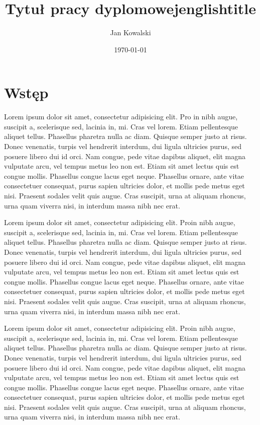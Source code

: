 \documentclass{mini}
\title{Tytuł pracy dyplomowej}
\title{englishtitle}
\author{Jan Kowalski}
\date{\today}
\begin{document}
\maketitle
\tableofcontents

\chapter*{Wstęp}

Lorem ipsum dolor sit amet, consectetur adipisicing elit. Pro	in nibh augue, suscipit a, scelerisque sed, lacinia in, mi. Cras vel lorem. Etiam pellentesque aliquet tellus. Phasellus pharetra nulla ac diam. Quisque semper justo at risus. Donec venenatis, turpis vel hendrerit interdum, dui ligula ultricies purus, sed posuere libero dui id orci. Nam congue, pede vitae dapibus aliquet, elit magna vulputate arcu, vel tempus metus leo non est. Etiam sit amet lectus quis est congue mollis. Phasellus congue lacus eget neque. Phasellus ornare, ante vitae consectetuer consequat, purus sapien ultricies dolor, et mollis pede metus eget nisi. Praesent sodales velit quis augue. Cras suscipit, urna at aliquam rhoncus, urna quam viverra nisi, in interdum massa nibh nec erat.

Lorem ipsum dolor sit amet, consectetur adipisicing elit. Proin nibh augue, suscipit a, scelerisque sed, lacinia in, mi. Cras vel lorem. Etiam pellentesque aliquet tellus. Phasellus pharetra nulla ac diam. Quisque semper justo at risus. Donec venenatis, turpis vel hendrerit interdum, dui ligula ultricies purus, sed posuere libero dui id orci. Nam congue, pede vitae dapibus aliquet, elit magna vulputate arcu, vel tempus metus leo non est. Etiam sit amet lectus quis est congue mollis. Phasellus congue lacus eget neque. Phasellus ornare, ante vitae consectetuer consequat, purus sapien ultricies dolor, et mollis pede metus eget nisi. Praesent sodales velit quis augue. Cras suscipit, urna at aliquam rhoncus, urna quam viverra nisi, in interdum massa nibh nec erat.

Lorem ipsum dolor sit amet, consectetur adipisicing elit. Proin nibh augue, suscipit a, scelerisque sed, lacinia in, mi. Cras vel lorem. Etiam pellentesque aliquet tellus. Phasellus pharetra nulla ac diam. Quisque semper justo at risus. Donec venenatis, turpis vel hendrerit interdum, dui ligula ultricies purus, sed posuere libero dui id orci. Nam congue, pede vitae dapibus aliquet, elit magna vulputate arcu, vel tempus metus leo non est. Etiam sit amet lectus quis est congue mollis. Phasellus congue lacus eget neque. Phasellus ornare, ante vitae consectetuer consequat, purus sapien ultricies dolor, et mollis pede metus eget nisi. Praesent sodales velit quis augue. Cras suscipit, urna at aliquam rhoncus, urna quam viverra nisi, in interdum massa nibh nec erat.
\end{document}
